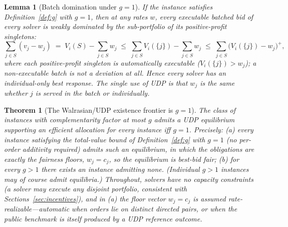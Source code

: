 \documentclass[11pt]{article}
\newtheorem{theorem}{Theorem}
\newtheorem{lemma}{Lemma}
\theoremstyle{remark}
\begin{document}
\begin{lemma}[Batch domination under $g=1$]\label{lem:domination}
If the instance satisfies Definition~\ref{def:g} with $g=1$, then at any
rates $w$, every executable batched bid of every solver is weakly
dominated by the sub-portfolio of its positive-profit singletons:
\[
\sum_{j\in S}(v_j-w_j)\;=\;V_i(S)-\sum_{j\in S}w_j
\;\le\;\sum_{j\in S}V_i(\{j\})-\sum_{j\in S}w_j
\;\le\;\sum_{j\in S}\big(V_i(\{j\})-w_j\big)^+,
\]
where each positive-profit singleton is automatically executable
($V_i(\{j\})>w_j$); a non-executable batch is not a deviation at all.
Hence every solver has an individual-only best response. The single use
of UDP is that $w_j$ is the same whether $j$ is served in the batch or
individually.
\end{lemma}

\begin{theorem}[The Walrasian/UDP existence frontier is $g=1$]
\label{prop:walras}
The class of instances with complementarity factor at most $g$ admits a
UDP equilibrium supporting an efficient allocation \emph{for every
instance} iff $g=1$. Precisely: (a) every instance satisfying the
total-value bound of Definition~\ref{def:g} with $g=1$ (no per-order
additivity required) admits such an equilibrium, in which the obligations
are exactly the fairness floors, $w_j=c_j$, so the equilibrium is best-bid
fair; (b) for every $g>1$ there exists an instance admitting none.
(Individual $g>1$ instances may of course admit equilibria.) Throughout,
solvers have no capacity constraints (a solver may execute any disjoint
portfolio, consistent with Sections~\ref{sec:incentives}), and in (a) the
floor vector $w_j=c_j$ is assumed rate-realizable---automatic when orders
lie on distinct directed pairs, or when the public benchmark is itself
produced by a UDP reference outcome.
\end{theorem}
\end{document}
